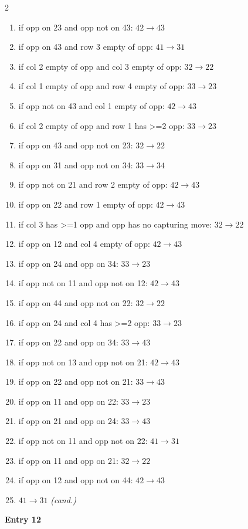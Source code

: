 \begin{multicols}{2}
\begin{tikzpicture}[scale=0.24]
\end{tikzpicture}
\nopagebreak\begin{enumerate}[topsep=1pt,itemsep=0pt,parsep=0pt,leftmargin=2.2em,label=\arabic*.]
\item if opp on 23 and opp not on 43: $42\!\to\!43$
\item if opp on 43 and row 3 empty of opp: $41\!\to\!31$
\item if col 2 empty of opp and col 3 empty of opp: $32\!\to\!22$
\item if col 1 empty of opp and row 4 empty of opp: $33\!\to\!23$
\item if opp not on 43 and col 1 empty of opp: $42\!\to\!43$
\item if col 2 empty of opp and row 1 has >=2 opp: $33\!\to\!23$
\item if opp on 43 and opp not on 23: $32\!\to\!22$
\item if opp on 31 and opp not on 34: $33\!\to\!34$
\item if opp not on 21 and row 2 empty of opp: $42\!\to\!43$
\item if opp on 22 and row 1 empty of opp: $42\!\to\!43$
\item if col 3 has >=1 opp and opp has no capturing move: $32\!\to\!22$
\item if opp on 12 and col 4 empty of opp: $42\!\to\!43$
\item if opp on 24 and opp on 34: $33\!\to\!23$
\item if opp not on 11 and opp not on 12: $42\!\to\!43$
\item if opp on 44 and opp not on 22: $32\!\to\!22$
\item if opp on 24 and col 4 has >=2 opp: $33\!\to\!23$
\item if opp on 22 and opp on 34: $33\!\to\!43$
\item if opp not on 13 and opp not on 21: $42\!\to\!43$
\item if opp on 22 and opp not on 21: $33\!\to\!43$
\item if opp on 11 and opp on 22: $33\!\to\!23$
\item if opp on 21 and opp on 24: $33\!\to\!43$
\item if opp not on 11 and opp not on 22: $41\!\to\!31$
\item if opp on 11 and opp on 21: $32\!\to\!22$
\item if opp on 12 and opp not on 44: $42\!\to\!43$
\item $41\!\to\!31$ \hfill\textit{(cand.)}
\end{enumerate}\smallskip
\noindent\textbf{Entry 12} \; 
\end{multicols}

